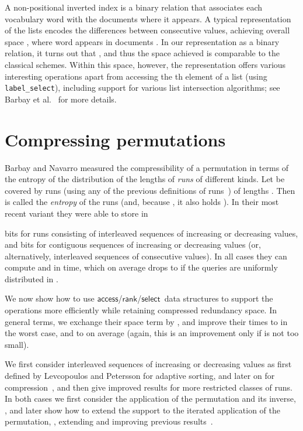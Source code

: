 \documentclass[11pt]{article}
\newcommand{\access}
    {\ensuremath{\mathsf{access}}}
\newcommand{\rank}
    {\ensuremath{\mathsf{rank}}}
\newcommand{\select}
    {\ensuremath{\mathsf{select}}}
\begin{document}
\begin{table}[t]
{\begin{tabular}
A non-positional inverted index is a binary relation that associates each
vocabulary word with the documents where it appears. A typical representation
of the lists encodes the differences between consecutive values, achieving
overall space , where word  appears in
 documents \cite{WMB99}. In our representation as a binary relation,
it turns out that , and thus the
space achieved is comparable to the classical schemes. Within this space,
however, the representation offers various interesting operations apart
from accessing the th element of a list (using {\tt label\_select}),
including support for various list intersection algorithms;
see Barbay et al.~\cite{BGMR07,BHMR07} for more details.

\section{Compressing permutations} \label{sec:permutations}

Barbay and Navarro \cite{BN09} measured the compressibility of a permutation 
 in terms of the entropy of the distribution of the lengths of {\em runs} 
of different kinds. Let  be covered by  runs (using any of the 
previous definitions of runs~\cite{LP94,BN09,Meh79})
of lengths .
Then  is called the {\em entropy} of the runs (and, because , it also holds ).
In their most recent variant \cite{BN11} they were able to store  in
 
bits for runs consisting of interleaved sequences of increasing or decreasing
values, and  
bits for contiguous sequences of increasing or decreasing values (or,
alternatively, interleaved sequences of consecutive values). 
In all cases they can compute  and  in 
 time, which on average drops to 
 if the queries are 
uniformly distributed in .

We now show how to use \access/\rank/\select\ data structures to support the 
operations more efficiently while retaining compressed redundancy space.
In general terms, we exchange their  space term by 
, and improve their times to  in the
worst case, and to  on average (again, this is an
improvement only if  is not too small).

We first consider interleaved sequences of
increasing or decreasing values as first defined by
Levcopoulos and Petersson \cite{LP94} for adaptive
sorting, and later on for compression~\cite{BN09}, and then give
improved results for more restricted classes of runs.
In both cases we first consider the application of the permutation
 and its inverse, , and later show how to extend the
support to the iterated application of the permutation, ,
extending and improving previous results~\cite{MRRR03}.


\end{tabular}}
\end{table}
\end{document}
